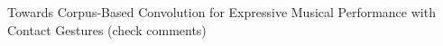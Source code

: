 Towards Corpus-Based Convolution for Expressive Musical Performance with Contact Gestures (check comments)
